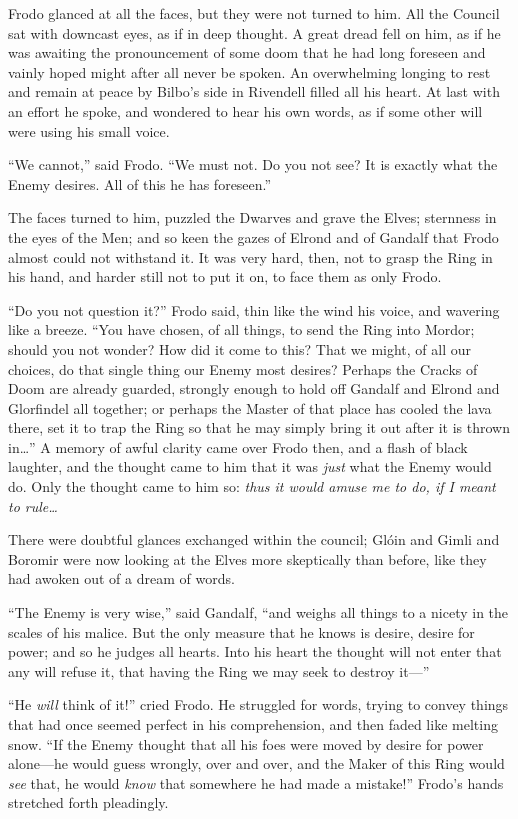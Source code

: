Frodo glanced at all the faces, but they were not turned to him. All the Council sat with downcast eyes, as if in deep thought. A great dread fell on him, as if he was awaiting the pronouncement of some doom that he had long foreseen and vainly hoped might after all never be spoken. An overwhelming longing to rest and remain at peace by Bilbo’s side in Rivendell filled all his heart. At last with an effort he spoke, and wondered to hear his own words, as if some other will were using his small voice.

“We cannot,” said Frodo. “We must not. Do you not see? It is exactly what the Enemy desires. All of this he has foreseen.”

The faces turned to him, puzzled the Dwarves and grave the Elves; sternness in the eyes of the Men; and so keen the gazes of Elrond and of Gandalf that Frodo almost could not withstand it. It was very hard, then, not to grasp the Ring in his hand, and harder still not to put it on, to face them as only Frodo.

“Do you not question it?” Frodo said, thin like the wind his voice, and wavering like a breeze. “You have chosen, of all things, to send the Ring into Mordor; should you not wonder? How did it come to this? That we might, of all our choices, do that single thing our Enemy most desires? Perhaps the Cracks of Doom are already guarded, strongly enough to hold off Gandalf and Elrond and Glorfindel all together; or perhaps the Master of that place has cooled the lava there, set it to trap the Ring so that he may simply bring it out after it is thrown in…” A memory of awful clarity came over Frodo then, and a flash of black laughter, and the thought came to him that it was \emph{just} what the Enemy would do. Only the thought came to him so: \emph{thus it would amuse me to do, if I meant to rule…}

There were doubtful glances exchanged within the council; Glóin and Gimli and Boromir were now looking at the Elves more skeptically than before, like they had awoken out of a dream of words.

“The Enemy is very wise,” said Gandalf, “and weighs all things to a nicety in the scales of his malice. But the only measure that he knows is desire, desire for power; and so he judges all hearts. Into his heart the thought will not enter that any will refuse it, that having the Ring we may seek to destroy it—”

“He \emph{will} think of it!” cried Frodo. He struggled for words, trying to convey things that had once seemed perfect in his comprehension, and then faded like melting snow. “If the Enemy thought that all his foes were moved by desire for power alone—he would guess wrongly, over and over, and the Maker of this Ring would \emph{see} that, he would \emph{know} that somewhere he had made a mistake!” Frodo’s hands stretched forth pleadingly.

